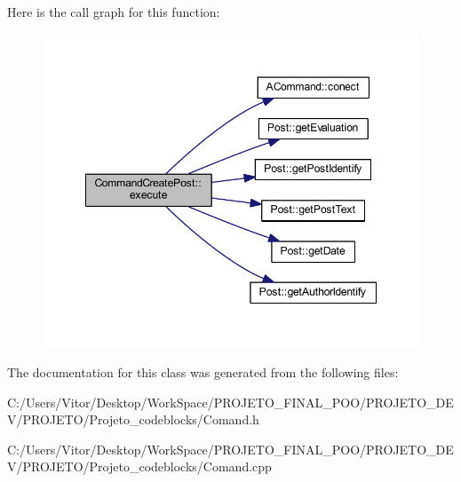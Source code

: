 Here is the call graph for this function\-:\nopagebreak
\begin{figure}[H]
\begin{center}
\leavevmode
\includegraphics[width=348pt]{class_command_create_post_ad13e9a228becc94f51d035875500eb69_cgraph}
\end{center}
\end{figure}




The documentation for this class was generated from the following files\-:\begin{DoxyCompactItemize}
\item 
C\-:/\-Users/\-Vitor/\-Desktop/\-Work\-Space/\-P\-R\-O\-J\-E\-T\-O\-\_\-\-F\-I\-N\-A\-L\-\_\-\-P\-O\-O/\-P\-R\-O\-J\-E\-T\-O\-\_\-\-D\-E\-V/\-P\-R\-O\-J\-E\-T\-O/\-Projeto\-\_\-codeblocks/Comand.\-h\item 
C\-:/\-Users/\-Vitor/\-Desktop/\-Work\-Space/\-P\-R\-O\-J\-E\-T\-O\-\_\-\-F\-I\-N\-A\-L\-\_\-\-P\-O\-O/\-P\-R\-O\-J\-E\-T\-O\-\_\-\-D\-E\-V/\-P\-R\-O\-J\-E\-T\-O/\-Projeto\-\_\-codeblocks/Comand.\-cpp\end{DoxyCompactItemize}
